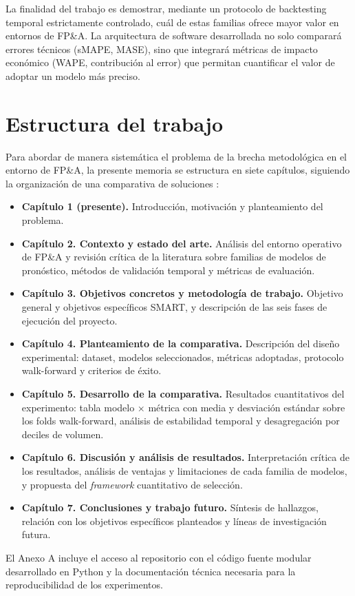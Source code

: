 La finalidad del trabajo es demostrar, mediante un protocolo de backtesting temporal estrictamente controlado, cuál de estas familias ofrece mayor valor en entornos de FP\&A. La arquitectura de software desarrollada no solo comparará errores técnicos (sMAPE, MASE), sino que integrará métricas de impacto económico (WAPE, contribución al error) que permitan cuantificar el valor de adoptar un modelo más preciso.

\section{Estructura del trabajo}
\label{sec:estructura}

Para abordar de manera sistemática el problema de la brecha metodológica en el entorno de FP\&A, la presente memoria se estructura en siete capítulos, siguiendo la organización de una comparativa de soluciones \parencite[§2.6]{Hyndman2021}:

\begin{itemize}
  \item \textbf{Capítulo 1 (presente).} Introducción, motivación y planteamiento del problema.
  \item \textbf{Capítulo 2. Contexto y estado del arte.} Análisis del entorno operativo de FP\&A y revisión crítica de la literatura sobre familias de modelos de pronóstico, métodos de validación temporal y métricas de evaluación.
  \item \textbf{Capítulo 3. Objetivos concretos y metodología de trabajo.} Objetivo general y objetivos específicos SMART, y descripción de las seis fases de ejecución del proyecto.
  \item \textbf{Capítulo 4. Planteamiento de la comparativa.} Descripción del diseño experimental: dataset, modelos seleccionados, métricas adoptadas, protocolo walk-forward y criterios de éxito.
  \item \textbf{Capítulo 5. Desarrollo de la comparativa.} Resultados cuantitativos del experimento: tabla modelo × métrica con media y desviación estándar sobre los folds walk-forward, análisis de estabilidad temporal y desagregación por deciles de volumen.
  \item \textbf{Capítulo 6. Discusión y análisis de resultados.} Interpretación crítica de los resultados, análisis de ventajas y limitaciones de cada familia de modelos, y propuesta del \textit{framework} cuantitativo de selección.
  \item \textbf{Capítulo 7. Conclusiones y trabajo futuro.} Síntesis de hallazgos, relación con los objetivos específicos planteados y líneas de investigación futura.
\end{itemize}

El Anexo A incluye el acceso al repositorio con el código fuente modular desarrollado en Python y la documentación técnica necesaria para la reproducibilidad de los experimentos.
